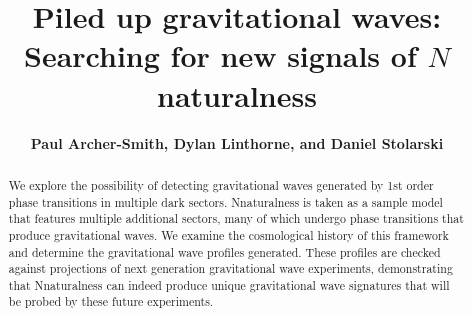 \documentclass[nofootinbib,twocolumn,preprintnumbers]{revtex4-2}
\begin{document}
\def\lsim{\mathrel{\rlap{\lower4pt\hbox{\hskip1pt$\sim$}}
  \raise1pt\hbox{$<$}}}
\def\gsim{\mathrel{\rlap{\lower4pt\hbox{\hskip1pt$\sim$}}
  \raise1pt\hbox{$>$}}}
\newcommand{\vev}[1]{ \left\langle {#1} \right\rangle }
\newcommand{\bra}[1]{ \langle {#1} | }
\newcommand{\ket}[1]{ | {#1} \rangle }
\newcommand{\ev}{ {\rm eV} }
\newcommand{\kev}{{\rm keV}}
\newcommand{\mev}{{\rm MeV}}
\newcommand{\gev}{{\mathrm GeV}}
\newcommand{\tev}{{\rm TeV}}
\newcommand{\mpl}{$M_{Pl}$}
\newcommand{\mw}{$M_{W}$}
\newcommand{\Ft}{F_{T}}
\newcommand{\Zparity}{\mathbb{Z}_2}
\newcommand{\BLambda}{\boldsymbol{\lambda}}
\newcommand{\met}{\;\not\!\!\!{E}_T}
\newcommand{\beq}{\begin{equation}}
\newcommand{\eeq}{\end{equation}}
\newcommand{\bea}{\begin{eqnarray}}
\newcommand{\eea}{\end{eqnarray}}
\newcommand{\nn}{\nonumber}
\newcommand{\hc}{\mathrm{h.c.}}
\newcommand{\eps}{\epsilon}
\newcommand{\bwt}{\begin{widetext}}
\newcommand{\ewt}{\end{widetext}}
\newcommand{\draftnote}[1]{{\bf\color{blue} #1}}

\newcommand{\cO}{{\cal O}}
\newcommand{\cL}{{\cal L}}
\newcommand{\cM}{{\cal M}}

\newcommand{\fref}[1]{Fig.~\ref{fig:#1}} 
\newcommand{\eref}[1]{Eq.~\eqref{eq:#1}} 
\newcommand{\aref}[1]{Appendix~\ref{app:#1}}
\newcommand{\sref}[1]{Section~\ref{sec:#1}}
\newcommand{\tref}[1]{Table~\ref{tab:#1}}

\title{\LARGE{{\bf{Piled up gravitational waves:} \\
\bf{Searching for new signals of $N$naturalness} }}}
\author{{\bf {Paul Archer-Smith, Dylan Linthorne, and Daniel Stolarski}}}





\begin{abstract}
We explore the possibility of detecting gravitational waves generated by 1st order phase transitions in multiple dark sectors. Nnaturalness is taken as a sample model that features multiple additional sectors, many of which undergo phase transitions that produce gravitational waves. We examine the cosmological history of this framework and determine the gravitational wave profiles generated. These profiles are checked against projections of next generation gravitational wave experiments, demonstrating that Nnaturalness can indeed produce unique gravitational wave signatures that will be probed by these future experiments. 
\end{abstract}
\end{document}
